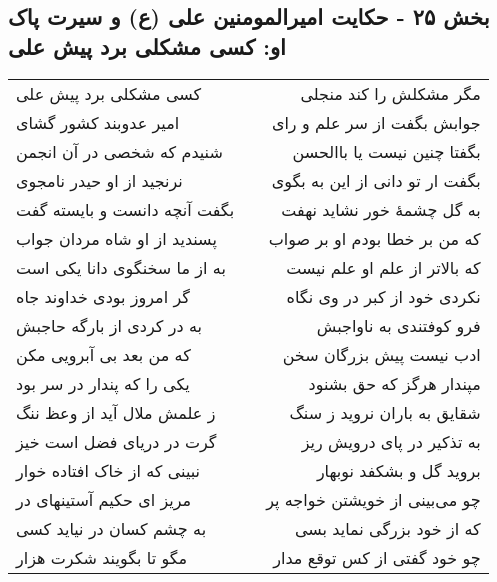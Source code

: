 \begin{center}
\section*{بخش ۲۵ - حکایت امیرالمومنین علی (ع) و سیرت پاک او: کسی مشکلی برد پیش علی}
\label{sec:025}
\begin{longtable}{l p{0.5cm} r}
کسی مشکلی برد پیش علی
&&
مگر مشکلش را کند منجلی
\\
امیر عدوبند کشور گشای
&&
جوابش بگفت از سر علم و رای
\\
شنیدم که شخصی در آن انجمن
&&
بگفتا چنین نیست یا باالحسن
\\
نرنجید از او حیدر نامجوی
&&
بگفت ار تو دانی از این به بگوی
\\
بگفت آنچه دانست و بایسته گفت
&&
به گل چشمهٔ خور نشاید نهفت
\\
پسندید از او شاه مردان جواب
&&
که من بر خطا بودم او بر صواب
\\
به از ما سخنگوی دانا یکی است
&&
که بالاتر از علم او علم نیست
\\
گر امروز بودی خداوند جاه
&&
نکردی خود از کبر در وی نگاه
\\
به در کردی از بارگه حاجبش
&&
فرو کوفتندی به ناواجبش
\\
که من بعد بی آبرویی مکن
&&
ادب نیست پیش بزرگان سخن
\\
یکی را که پندار در سر بود
&&
مپندار هرگز که حق بشنود
\\
ز علمش ملال آید از وعظ ننگ
&&
شقایق به باران نروید ز سنگ
\\
گرت در دریای فضل است خیز
&&
به تذکیر در پای درویش ریز
\\
نبینی که از خاک افتاده خوار
&&
بروید گل و بشکفد نوبهار
\\
مریز ای حکیم آستینهای در
&&
چو می‌بینی از خویشتن خواجه پر
\\
به چشم کسان در نیاید کسی
&&
که از خود بزرگی نماید بسی
\\
مگو تا بگویند شکرت هزار
&&
چو خود گفتی از کس توقع مدار
\\
\end{longtable}
\end{center}
